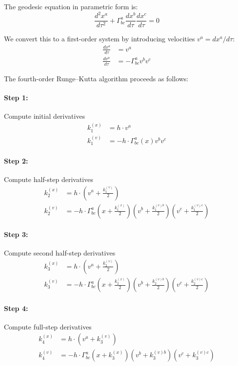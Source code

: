 The geodesic equation in parametric form is:
\begin{equation}
\frac{d^2 x^a}{d\tau^2} + \Gamma^a_{bc} \frac{dx^b}{d\tau} \frac{dx^c}{d\tau} = 0
\end{equation}

We convert this to a first-order system by introducing velocities $v^a = dx^a/d\tau$:
\begin{align}
\frac{dx^a}{d\tau} &= v^a \\
\frac{dv^a}{d\tau} &= -\Gamma^a_{bc} v^b v^c
\end{align}

The fourth-order Runge--Kutta algorithm proceeds as follows:

\paragraph{Step 1:} Compute initial derivatives
\begin{align}
k_1^{(x)} &= h \cdot v^a \\
k_1^{(v)} &= -h \cdot \Gamma^a_{bc}(x) v^b v^c
\end{align}

\paragraph{Step 2:} Compute half-step derivatives
\begin{align}
k_2^{(x)} &= h \cdot \left(v^a + \frac{k_1^{(v)}}{2}\right) \\
k_2^{(v)} &= -h \cdot \Gamma^a_{bc}\left(x + \frac{k_1^{(x)}}{2}\right) \left(v^b + \frac{k_1^{(v)b}}{2}\right) \left(v^c + \frac{k_1^{(v)c}}{2}\right)
\end{align}

\paragraph{Step 3:} Compute second half-step derivatives
\begin{align}
k_3^{(x)} &= h \cdot \left(v^a + \frac{k_2^{(v)}}{2}\right) \\
k_3^{(v)} &= -h \cdot \Gamma^a_{bc}\left(x + \frac{k_2^{(x)}}{2}\right) \left(v^b + \frac{k_2^{(v)b}}{2}\right) \left(v^c + \frac{k_2^{(v)c}}{2}\right)
\end{align}

\paragraph{Step 4:} Compute full-step derivatives
\begin{align}
k_4^{(x)} &= h \cdot \left(v^a + k_3^{(v)}\right) \\
k_4^{(v)} &= -h \cdot \Gamma^a_{bc}\left(x + k_3^{(x)}\right) \left(v^b + k_3^{(v)b}\right) \left(v^c + k_3^{(v)c}\right)
\end{align}

